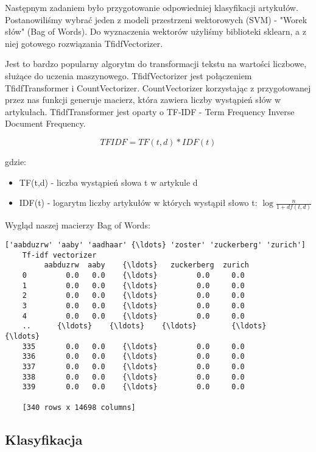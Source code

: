 \documentclass[11pt]{article}
\begin{document}
Następnym zadaniem było przygotowanie odpowiedniej klasyfikacji artykułów.
Postanowiliśmy wybrać jeden z modeli przestrzeni wektorowych (SVM) - "Worek słów"
(Bag of Words). Do wyznaczenia wektorów użyliśmy biblioteki sklearn, a z niej 
gotowego rozwiązania TfidfVectorizer.

Jest to bardzo popularny algorytm do transformacji tekstu na wartości liczbowe,
służące do uczenia maszynowego. TfidfVectorizer jest połączeniem TfidfTransformer
i CountVectorizer. CountVectorizer korzystając z przygotowanej przez nas 
funkcji generuje macierz, która zawiera liczby wystąpień słów w artykułach. 
TfidfTransformer jest oparty o
TF-IDF - Term Frequency Inverse Document Frequency.

\[ TFIDF = TF(t,d) * IDF(t) \]

gdzie:
\begin{itemize}
    \item TF(t,d) - liczba wystąpień słowa t w artykule d
    \item IDF(t) - logarytm liczby artykułów w których wystąpił słowo t: \( \log\frac{n}{1+df(t,d)} \)
\end{itemize}

Wygląd naszej macierzy Bag of Words:

\begin{Verbatim}[commandchars=\\\{\}]
    ['aabduzrw' 'aaby' 'aadhaar' {\ldots} 'zoster' 'zuckerberg' 'zurich']
    Tf-idf vectorizer
         aabduzrw  aaby    {\ldots}   zuckerberg  zurich
    0         0.0   0.0    {\ldots}         0.0     0.0
    1         0.0   0.0    {\ldots}         0.0     0.0
    2         0.0   0.0    {\ldots}         0.0     0.0
    3         0.0   0.0    {\ldots}         0.0     0.0
    4         0.0   0.0    {\ldots}         0.0     0.0
    ..      {\ldots}    {\ldots}    {\ldots}        {\ldots}     {\ldots}
    335       0.0   0.0    {\ldots}         0.0     0.0
    336       0.0   0.0    {\ldots}         0.0     0.0
    337       0.0   0.0    {\ldots}         0.0     0.0
    338       0.0   0.0    {\ldots}         0.0     0.0
    339       0.0   0.0    {\ldots}         0.0     0.0   
         
    [340 rows x 14698 columns]
\end{Verbatim}
    

\subsection*{Klasyfikacja}
\end{document}
